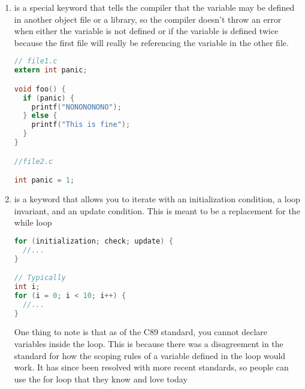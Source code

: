 \begin{enumerate}
\begin{lstlisting}[language=C]
void process_day(enum day foo) {
  switch(foo) {
    case monday:
      printf("Go home!\n"); break;
    // ...
  }
}
\end{lstlisting}

	      It is completely possible to assign enum values to either be different or the same. Just don't rely on the compiler for consistent numbering. If you are going to use this abstraction, try not to break it.

	      \begin{lstlisting}[language=C]
enum day{ 
  monday = 0, 
  tuesday = 0, 
  wednesday = 0,
  thursday = 1, 
  friday = 10, 
  saturday = 10, 
  sunday = 0};

void process_day(enum day foo) {
  switch(foo) {
    case monday:
      printf("Go home!\n"); break;
    // ...
  }
}
\end{lstlisting}

	\item {} is a special keyword that tells the compiler that the variable may be defined in another object file or a library, so the compiler doesn't throw an error when either the variable is not defined or if the variable is defined twice because the first file will really be referencing the variable in the other file.

	      \begin{lstlisting}[language=C]
// file1.c
extern int panic;

void foo() {
  if (panic) {
    printf("NONONONONO");
  } else {
    printf("This is fine");
  }
}

//file2.c

int panic = 1;
\end{lstlisting}

	\item {} is a keyword that allows you to iterate with an initialization condition, a loop invariant, and an update condition. This is meant to be a replacement for the while loop

	      \begin{lstlisting}[language=C]
for (initialization; check; update) {
  //...
}

// Typically
int i;
for (i = 0; i < 10; i++) {
  //...
}
\end{lstlisting}

	      One thing to note is that as of the C89 standard, you cannot declare variables inside the  loop. This is because there was a disagreement in the standard for how the scoping rules of a variable defined in the loop would work. It has since been resolved with more recent standards, so people can use the for loop that they know and love today


\end{enumerate}
